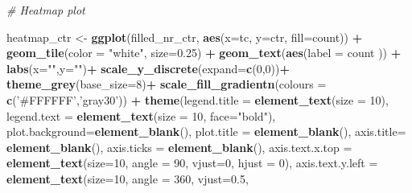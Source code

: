 \documentclass[
]{article}
\newenvironment{Shaded}{\begin{snugshade}}{\end{snugshade}}
\newcommand{\CommentTok}[1]{\textcolor[rgb]{0.56,0.35,0.01}{\textit{#1}}}
\newcommand{\DataTypeTok}[1]{\textcolor[rgb]{0.13,0.29,0.53}{#1}}
\newcommand{\DecValTok}[1]{\textcolor[rgb]{0.00,0.00,0.81}{#1}}
\newcommand{\FloatTok}[1]{\textcolor[rgb]{0.00,0.00,0.81}{#1}}
\newcommand{\KeywordTok}[1]{\textcolor[rgb]{0.13,0.29,0.53}{\textbf{#1}}}
\newcommand{\NormalTok}[1]{#1}
\newcommand{\OperatorTok}[1]{\textcolor[rgb]{0.81,0.36,0.00}{\textbf{#1}}}
\newcommand{\StringTok}[1]{\textcolor[rgb]{0.31,0.60,0.02}{#1}}
\begin{document}
\begin{Shaded}
\begin{Highlighting}[]
{{{{{{{{{{{        
\CommentTok{# Heatmap plot}


\NormalTok{heatmap_ctr <-}\StringTok{ }\KeywordTok{ggplot}\NormalTok{(filled_nr_ctr,}
                      \KeywordTok{aes}\NormalTok{(}\DataTypeTok{x=}\NormalTok{tc, }\DataTypeTok{y=}\NormalTok{ctr, }\DataTypeTok{fill=}\NormalTok{count)) }\OperatorTok{+}
\StringTok{                      }\KeywordTok{geom_tile}\NormalTok{(}\DataTypeTok{color =} \StringTok{"white"}\NormalTok{, }\DataTypeTok{size=}\FloatTok{0.25}\NormalTok{) }\OperatorTok{+}
\StringTok{                      }\KeywordTok{geom_text}\NormalTok{(}\KeywordTok{aes}\NormalTok{(}\DataTypeTok{label =}\NormalTok{ count )) }\OperatorTok{+}
\StringTok{                      }\KeywordTok{labs}\NormalTok{(}\DataTypeTok{x=}\StringTok{""}\NormalTok{,}\DataTypeTok{y=}\StringTok{""}\NormalTok{)}\OperatorTok{+}
\StringTok{                      }\KeywordTok{scale_y_discrete}\NormalTok{(}\DataTypeTok{expand=}\KeywordTok{c}\NormalTok{(}\DecValTok{0}\NormalTok{,}\DecValTok{0}\NormalTok{))}\OperatorTok{+}
\StringTok{                      }\KeywordTok{theme_grey}\NormalTok{(}\DataTypeTok{base_size=}\DecValTok{8}\NormalTok{)}\OperatorTok{+}
\StringTok{                      }\KeywordTok{scale_fill_gradientn}\NormalTok{(}\DataTypeTok{colours =} \KeywordTok{c}\NormalTok{(}\StringTok{'#FFFFFF'}\NormalTok{,}\StringTok{'gray30'}\NormalTok{)) }\OperatorTok{+}
\StringTok{                      }\KeywordTok{theme}\NormalTok{(}\DataTypeTok{legend.title =} \KeywordTok{element_text}\NormalTok{(}\DataTypeTok{size =} \DecValTok{10}\NormalTok{),}
                      \DataTypeTok{legend.text =} \KeywordTok{element_text}\NormalTok{(}\DataTypeTok{size =} \DecValTok{10}\NormalTok{, }\DataTypeTok{face=}\StringTok{"bold"}\NormalTok{),}
                      \DataTypeTok{plot.background=}\KeywordTok{element_blank}\NormalTok{(),}
                      \DataTypeTok{plot.title =} \KeywordTok{element_blank}\NormalTok{(),}
                      \DataTypeTok{axis.title=} \KeywordTok{element_blank}\NormalTok{(),}
                      \DataTypeTok{axis.ticks =} \KeywordTok{element_blank}\NormalTok{(),}
                      \DataTypeTok{axis.text.x.top =} \KeywordTok{element_text}\NormalTok{(}\DataTypeTok{size=}\DecValTok{10}\NormalTok{, }\DataTypeTok{angle =} \DecValTok{90}\NormalTok{, }\DataTypeTok{vjust=}\DecValTok{0}\NormalTok{,}
                                                     \DataTypeTok{hjust =} \DecValTok{0}\NormalTok{),}
                      \DataTypeTok{axis.text.y.left =} \KeywordTok{element_text}\NormalTok{(}\DataTypeTok{size=}\DecValTok{10}\NormalTok{, }\DataTypeTok{angle =} \DecValTok{360}\NormalTok{, }\DataTypeTok{vjust=}\FloatTok{0.5}\NormalTok{,}
}}}}}}}}}}}
\end{Highlighting}
\end{Shaded}
\end{document}
